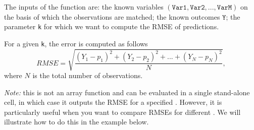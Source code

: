 \documentclass[12pt]{article}
\begin{document}
The inputs of the function are: the known variables $(\texttt{Var1},\texttt{Var2},...,\texttt{VarM})$ on the basis of which the observations are matched; the known outcomes $\texttt{Y}$; the parameter \texttt{k} for which we want to compute the RMSE of predictions.

For a given \texttt{k}, the error is computed as follows
\[
RMSE = \sqrt{\frac{(Y_1-p_1)^2+(Y_2-p_2)^2+...+(Y_N-p_N)^2}{N}},
\]
where $N$ is the total number of observations.

\textit{Note:} this is not an array function and can be evaluated in a single stand-alone cell, in which case it outputs the RMSE for a specified . However, it is particularly useful when you want to compare RMSEs for different . We will illustrate how to do this in the example below.
\end{document}
